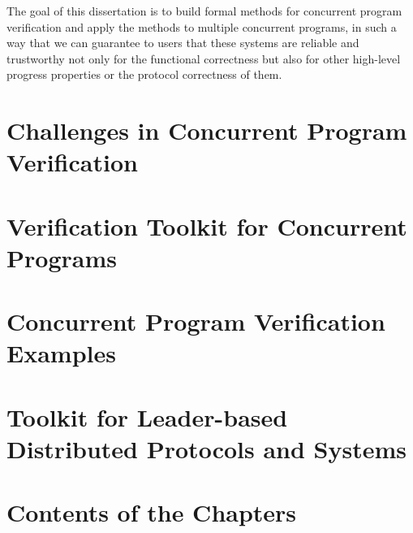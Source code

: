 
The goal of this dissertation is to build formal methods for concurrent program verification and apply the methods to multiple concurrent programs,
in such a way that we can guarantee to users that these systems are reliable and trustworthy not only for the functional correctness but also for 
other high-level progress properties or the protocol correctness of them. 

\section{Challenges in Concurrent Program Verification}
\label{chapter:introduction:sec:challenges-in-concurrent-program-verification}

\section{Verification Toolkit for Concurrent Programs}
\label{chapter:introduction:sec:verification-toolkit-for-concurrent-programs}


\section{Concurrent Program Verification Examples}
\label{chapter:introduction:sec:concurrent-program-verification-examples}

\section{Toolkit for Leader-based Distributed Protocols and Systems}
\label{chapter:introduction:sec:toolkit-for-leader-based-distributed-protocols-and-systems}

\section{Contents of the Chapters}
\label{chapter:introduction:sec:contents-of-the-chapters}


